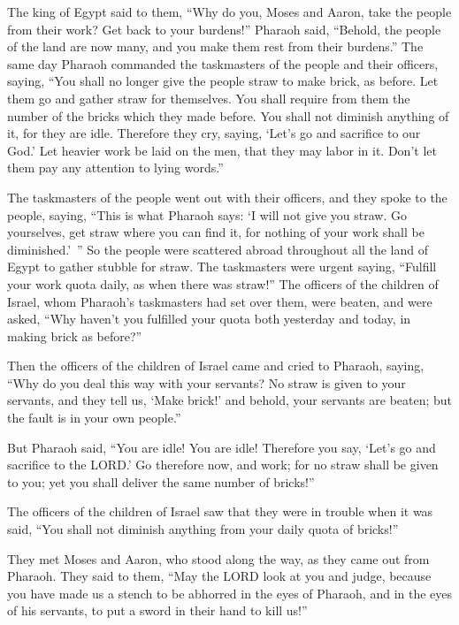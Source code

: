 \myverse{}The king of Egypt said to them, “Why do you, Moses and Aaron, take the people from their work? Get back to your burdens!” \myverse{}Pharaoh said, “Behold, the people of the land are now many, and you make them rest from their burdens.” \myverse{}The same day Pharaoh commanded the taskmasters of the people and their officers, saying, \myverse{}“You shall no longer give the people straw to make brick, as before. Let them go and gather straw for themselves. \myverse{}You shall require from them the number of the bricks which they made before. You shall not diminish anything of it, for they are idle. Therefore they cry, saying, ‘Let’s go and sacrifice to our God.’ \myverse{}Let heavier work be laid on the men, that they may labor in it. Don’t let them pay any attention to lying words.”


\myverse{}The taskmasters of the people went out with their officers, and they spoke to the people, saying, “This is what Pharaoh says: ‘I will not give you straw. \myverse{}Go yourselves, get straw where you can find it, for nothing of your work shall be diminished.’ ” \myverse{}So the people were scattered abroad throughout all the land of Egypt to gather stubble for straw. \myverse{}The taskmasters were urgent saying, “Fulfill your work quota daily, as when there was straw!” \myverse{}The officers of the children of Israel, whom Pharaoh’s taskmasters had set
over them, were beaten, and were asked, “Why haven’t you fulfilled your quota both yesterday and today, in making brick as before?”

\myverse{}Then the officers of the children of Israel came and cried to
Pharaoh, saying, “Why do you deal this way with your servants? \myverse{}No straw is given to your servants, and they tell us, ‘Make brick!’ and behold, your servants are beaten; but the fault is in your own people.”

\myverse{}But Pharaoh said, “You are idle! You are idle! Therefore you say, ‘Let’s go and sacrifice to the LORD.’ \myverse{}Go therefore now, and work; for no straw shall be given to you; yet you shall deliver the same number of bricks!”


\myverse{}The officers of the children of Israel saw that they were in trouble when it was said, “You shall not diminish anything from your daily quota of bricks!”


\myverse{}They met Moses and Aaron, who stood along the way, as they came out from Pharaoh. \myverse{}They said to them, “May the LORD look at you and judge, because you have made us a stench to be abhorred in the eyes of Pharaoh, and in the eyes of his servants, to put a sword in their hand to kill us!”



